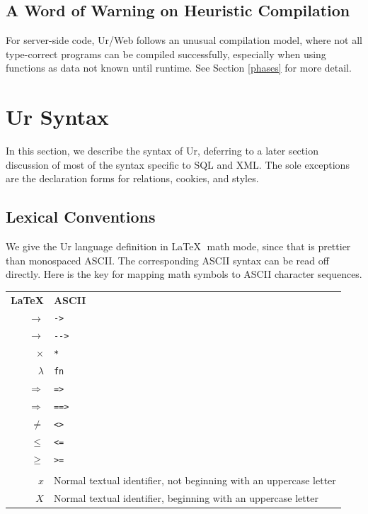\documentclass{article}
\newcommand{\cd}[1]{\texttt{#1}}
\begin{document}
\subsection{A Word of Warning on Heuristic Compilation}

For server-side code, Ur/Web follows an unusual compilation model, where not all type-correct programs can be compiled successfully, especially when using functions as data not known until runtime.  See Section \ref{phases} for more detail.


\section{Ur Syntax}

In this section, we describe the syntax of Ur, deferring to a later section discussion of most of the syntax specific to SQL and XML.  The sole exceptions are the declaration forms for relations, cookies, and styles.

\subsection{Lexical Conventions}

We give the Ur language definition in \LaTeX $\;$ math mode, since that is prettier than monospaced ASCII.  The corresponding ASCII syntax can be read off directly.  Here is the key for mapping math symbols to ASCII character sequences.

\begin{center}
  \begin{tabular}{rl}
    \textbf{\LaTeX} & \textbf{ASCII} \\
    $\to$ & \cd{->} \\
    $\longrightarrow$ & \cd{-{}->} \\
    $\times$ & \cd{*} \\
    $\lambda$ & \cd{fn} \\
    $\Rightarrow$ & \cd{=>} \\
    $\Longrightarrow$ & \cd{==>} \\
    $\neq$ & \cd{<>} \\
    $\leq$ & \cd{<=} \\
    $\geq$ & \cd{>=} \\
    \\
    $x$ & Normal textual identifier, not beginning with an uppercase letter \\
    $X$ & Normal textual identifier, beginning with an uppercase letter \\
  \end{tabular}
\end{center}
\end{document}
